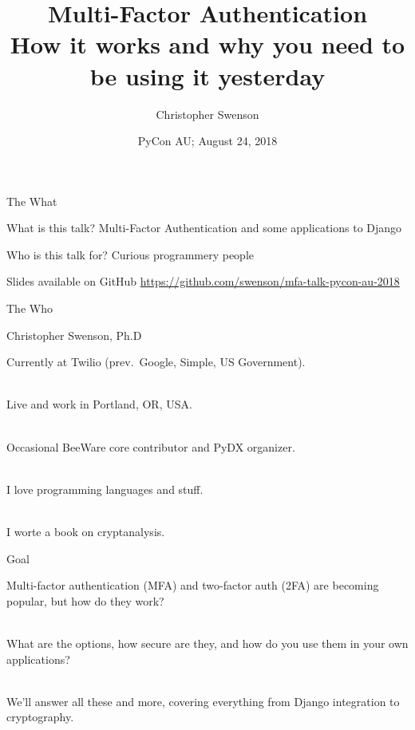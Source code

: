 \documentclass{beamer}
\title[MFA]{Multi-Factor Authentication\\ How it works and why you need to be using it yesterday}
\author[@chris\_{}swenson]{Christopher Swenson}
\date[PyCon AU 2018]{PyCon AU; August 24, 2018}
\begin{document}
\begin{frame}
\titlepage
\end{frame}

\begin{frame}{The What}

\begin{block}{What is this talk?}
Multi-Factor Authentication and some applications to Django
\end{block}

\begin{block}{Who is this talk for?}
Curious programmery people
\end{block}

\begin{block}{Slides available on GitHub}
\url{https://github.com/swenson/mfa-talk-pycon-au-2018}
\end{block}

\end{frame}

\begin{frame}{The Who}

\begin{block}{Christopher Swenson, Ph.D}

Currently at Twilio (prev.\ Google, Simple, US Government).

\ \\

Live and work in Portland, OR, USA.

\ \\

Occasional BeeWare core contributor and PyDX organizer.

\ \\

I love programming languages and stuff.

\ \\

I worte a book on cryptanalysis.

\end{block}

\end{frame}

\begin{frame}{Goal}

Multi-factor authentication (MFA) and two-factor auth (2FA) are becoming popular, but how do they work?

\ \\

What are the options, how secure are they, and how do you use them in your own applications?

\ \\

We'll answer all these and more, covering everything from Django integration to cryptography.

\end{frame}
\end{document}
